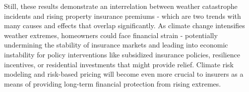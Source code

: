 \documentclass[12pt]{article}
\begin{document}
Still, these results demonstrate an interrelation between weather catastrophe incidents and rising property insurance premiums - which are 
two trends with many causes and effects that overlap significantly. As climate change intensifies weather extremes, homeowners could 
face financial strain - potentially undermining the stability of insurance markets and leading into economic instability for policy 
interventions like subsidized insurance policies\cite{iii}, resilience incentives, or residential investments\cite{kousky} that 
might provide relief. Climate risk modeling and risk-based pricing will become even more crucial to insurers as a means of providing 
long-term financial protection from rising extremes.






\end{document}
